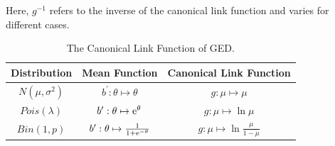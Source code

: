 Here, $g^{-1}$ refers to the inverse of the canonical link function and varies for different cases.


\begin{table}[htb]
\centering
\caption{The Canonical Link Function of GED.}
\vspace{.2cm}
\begin{tabular}{c c c}
\toprule
Distribution &Mean Function & Canonical Link Function \\
\midrule
$N(\mu,\sigma^2)$ & $b^\prime: \theta \mapsto \theta$ & $g: \mu \mapsto \mu$ \\
$Pois(\lambda)$ & $b^\prime: \theta \mapsto \mathrm{e}^{\theta}$& $g: \mu \mapsto \ln \mu$\\
$Bin(1,p)$ & $b^\prime: \theta \mapsto \frac{1}{1+\mathrm{e}^{-\theta}}$ & $g: \mu \mapsto \ln \frac{\mu}{1-\mu}$ \\
\bottomrule
\end{tabular} 
\label{tab:GLM}
\end{table}















